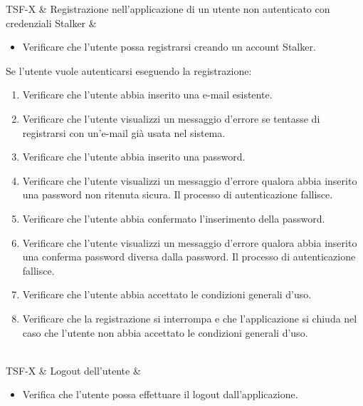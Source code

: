 TSF-X & Registrazione nell'applicazione di un utente non autenticato con credenziali Stalker & \begin{itemize}
    \item Verificare che l'utente possa registrarsi creando un account Stalker.
\end{itemize}
Se l'utente vuole autenticarsi eseguendo la registrazione:
\begin{enumerate}
    \item Verificare che l'utente abbia inserito una e-mail esistente.
    \item Verificare che l'utente visualizzi un messaggio d'errore se tentasse di registrarsi con un'e-mail già usata nel sistema.
    \item Verificare che l'utente abbia inserito una password.
    \item Verificare che l'utente visualizzi un messaggio d'errore qualora abbia inserito una password non ritenuta sicura. Il processo di autenticazione fallisce.
    \item Verificare che l'utente abbia confermato l'inserimento della password.
    \item Verificare che l'utente visualizzi un messaggio d'errore qualora abbia inserito una conferma password diversa dalla password. Il processo di autenticazione fallisce.
    \item Verificare che l'utente abbia accettato le condizioni generali d'uso.
    \item Verificare che la registrazione si interrompa e che l'applicazione si chiuda nel caso che l'utente non abbia accettato le condizioni generali d'uso.
\end{enumerate} \\

TSF-X & Logout dell'utente & \begin{itemize}
    \item Verifica che l'utente possa effettuare il logout dall'applicazione.
\end{itemize} \\

